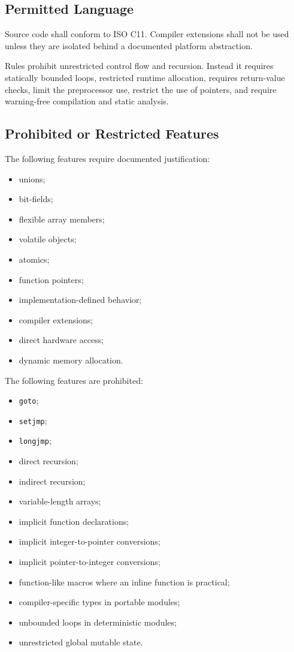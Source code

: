 \subsection{Permitted Language}

Source code shall conform to ISO C11. Compiler extensions shall not be used unless they are isolated behind a documented platform abstraction.

Rules prohibit unrestricted control flow and recursion. Instead it requires statically bounded loops, restricted runtime allocation, requires return-value checks, limit the preprocessor use, restrict the use of pointers, and require warning-free compilation and static analysis.
\subsection{Prohibited or Restricted Features}

The following features require documented justification:

\begin{itemize}
	\item unions;
	\item bit-fields;
	\item flexible array members;
	\item volatile objects;
	\item atomics;
	\item function pointers;
	\item implementation-defined behavior;
	\item compiler extensions;
	\item direct hardware access;
	\item dynamic memory allocation.
\end{itemize}

The following features are prohibited:

\begin{itemize}
	\item \texttt{goto};
	\item \texttt{setjmp};
	\item \texttt{longjmp};
	\item direct recursion;
	\item indirect recursion;
	\item variable-length arrays;
	\item implicit function declarations;
	\item implicit integer-to-pointer conversions;
	\item implicit pointer-to-integer conversions;
	\item function-like macros where an inline function is practical;
	\item compiler-specific types in portable modules;
	\item unbounded loops in deterministic modules;
	\item unrestricted global mutable state.
\end{itemize}
